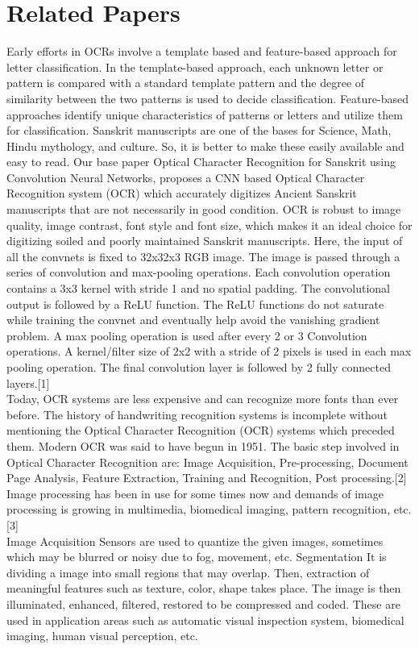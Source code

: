 \section{Related Papers}
Early efforts in OCRs involve a template based and feature-based approach for letter classification. In the template-based approach, each unknown letter or pattern is compared with a standard template pattern and the degree of similarity between the two patterns is used to decide classification. Feature-based approaches identify unique characteristics of patterns or letters and utilize them for classification. Sanskrit manuscripts are one of the bases for Science, Math, Hindu mythology, and culture. So, it is better to make these easily available and easy to read. Our base paper Optical Character Recognition for Sanskrit using Convolution Neural Networks, proposes a CNN based Optical Character Recognition system (OCR) which accurately digitizes Ancient Sanskrit manuscripts that are not necessarily in good condition. OCR is robust to image quality, image contrast, font style and font size, which makes it an ideal choice for digitizing soiled and poorly maintained Sanskrit manuscripts. Here, the input of all the convnets is fixed to 32x32x3 RGB image. The image is passed through a series of convolution and max-pooling operations. Each convolution operation contains a 3x3 kernel with stride 1 and no spatial padding. The convolutional output is followed by a ReLU function. The ReLU functions do not saturate while training the convnet and eventually help avoid the vanishing gradient problem. A max pooling operation is used after every 2 or 3 Convolution operations. A kernel/filter size of 2x2 with a stride of 2 pixels is used in each max pooling operation. The final convolution layer is followed by 2 fully connected layers.[1]\\
Today, OCR systems are less expensive and can recognize more fonts than ever before. The history of handwriting recognition systems is incomplete without mentioning the Optical Character Recognition (OCR) systems which preceded them. Modern OCR was said to have begun in 1951. The basic step involved in Optical Character Recognition are: Image Acquisition, Pre-processing, Document Page Analysis, Feature Extraction, Training and Recognition, Post processing.[2] Image processing has been in use for some times now and demands of image processing is growing in multimedia, biomedical imaging, pattern recognition, etc. [3]\\ Image Acquisition Sensors are used to quantize the given images, sometimes which may be blurred or noisy due to fog, movement, etc. Segmentation It is dividing a image into small regions that may overlap. Then, extraction of meaningful features such as texture, color, shape takes place. The image is then illuminated, enhanced, filtered, restored to be compressed and coded. These are used in application areas such as automatic visual inspection system, biomedical imaging, human visual perception, etc.\\
